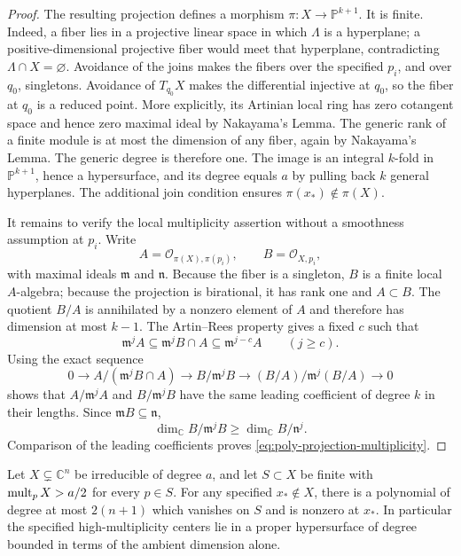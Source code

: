 \begin{proof}
The resulting projection defines a morphism $\pi:X\longrightarrow \mathbb{P}^{k+1}$.  It is finite.  Indeed, a fiber lies in a projective linear space in which $\Lambda$ is a hyperplane; a positive-dimensional projective fiber would meet that hyperplane, contradicting $\Lambda\cap X=\varnothing$.  Avoidance of the joins makes the fibers over the specified $p_i$, and over $q_0$, singletons. Avoidance of $T_{q_0}X$ makes the differential injective at $q_0$, so the fiber at $q_0$ is a reduced point.  More explicitly, its Artinian local ring has zero cotangent space and hence zero maximal ideal by Nakayama's Lemma.  The generic rank of a finite module is at most the dimension of any fiber, again by Nakayama's Lemma. The generic degree is therefore one.  The image is an integral $k$-fold in $\mathbb{P}^{k+1}$, hence a hypersurface, and its degree equals $a$ by pulling back $k$ general hyperplanes.  The additional join condition ensures $\pi(x_*)\notin\pi(X)$.

It remains to verify the local multiplicity assertion without a smoothness assumption at $p_i$.  Write
\[
 A=\mathcal{O}_{\pi(X),\pi(p_i)},\qquad
 B=\mathcal{O}_{X,p_i},
\]
with maximal ideals $\mathfrak{m}$ and $\mathfrak{n}$.  Because the fiber is a singleton, $B$ is a finite local $A$-algebra; because the projection is birational, it has rank one and $A\subset B$. The quotient $B/A$ is annihilated by a nonzero element of $A$ and therefore has dimension at most $k-1$.  The Artin--Rees property gives a fixed $c$ such that
\[
 \mathfrak{m}^jA\subseteq\mathfrak{m}^jB\cap A
                  \subseteq\mathfrak{m}^{j-c}A\qquad(j\ge c).
\]
Using the exact sequence
\[
 0\longrightarrow A/(\mathfrak{m}^jB\cap A)
 \longrightarrow B/\mathfrak{m}^jB
 \longrightarrow (B/A)/\mathfrak{m}^j(B/A)\longrightarrow0
\]
shows that $A/\mathfrak{m}^jA$ and $B/\mathfrak{m}^jB$ have the same leading coefficient of degree $k$ in their lengths.  Since $\mathfrak{m}B\subseteq\mathfrak{n}$,
\[
 \dim_{\mathbb{C}} B/\mathfrak{m}^jB\ge
       \dim_{\mathbb{C}}B/\mathfrak{n}^j.
\]
Comparison of the leading coefficients proves \eqref{eq:poly-projection-multiplicity}.
\end{proof}

\begin{corollary}
\label{cor:poly-high-multiplicity}
Let $X\subsetneq\mathbb{C}^n$ be irreducible of degree $a$, and let $S\subset X$ be finite with $\operatorname{mult}_pX>a/2$ for every $p\in S$. For any specified $x_*\notin X$, there is a polynomial of degree at most $2(n+1)$ which vanishes on $S$ and is nonzero at $x_*$. In particular the specified high-multiplicity centers lie in a proper hypersurface of degree bounded in terms of the ambient dimension alone.
\end{corollary}

